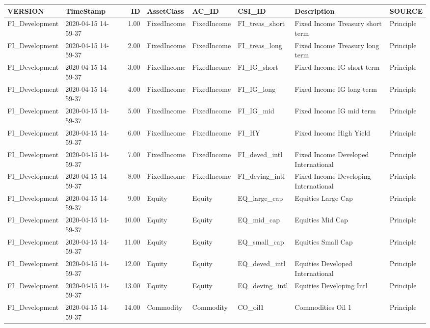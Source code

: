 \begin{longtable}{llrlllll}
  \hline
VERSION & TimeStamp & ID & AssetClass & AC\_ID & CSI\_ID & Description & SOURCE \\ 
  \hline
FI\_Development & 2020-04-15 14-59-37 & 1.00 & FixedIncome & FixedIncome & FI\_treas\_short & Fixed Income Treasury short term & Principle \\ 
  FI\_Development & 2020-04-15 14-59-37 & 2.00 & FixedIncome & FixedIncome & FI\_treas\_long & Fixed Income Treasury long term & Principle \\ 
  FI\_Development & 2020-04-15 14-59-37 & 3.00 & FixedIncome & FixedIncome & FI\_IG\_short & Fixed Income IG short term & Principle \\ 
  FI\_Development & 2020-04-15 14-59-37 & 4.00 & FixedIncome & FixedIncome & FI\_IG\_long & Fixed Income IG long term & Principle \\ 
  FI\_Development & 2020-04-15 14-59-37 & 5.00 & FixedIncome & FixedIncome & FI\_IG\_mid & Fixed Income IG mid term & Principle \\ 
  FI\_Development & 2020-04-15 14-59-37 & 6.00 & FixedIncome & FixedIncome & FI\_HY & Fixed Income High Yield & Principle \\ 
  FI\_Development & 2020-04-15 14-59-37 & 7.00 & FixedIncome & FixedIncome & FI\_deved\_intl & Fixed Income Developed International & Principle \\ 
  FI\_Development & 2020-04-15 14-59-37 & 8.00 & FixedIncome & FixedIncome & FI\_deving\_intl & Fixed Income Developing International & Principle \\ 
  FI\_Development & 2020-04-15 14-59-37 & 9.00 & Equity & Equity & EQ\_large\_cap & Equities Large Cap & Principle \\ 
  FI\_Development & 2020-04-15 14-59-37 & 10.00 & Equity & Equity & EQ\_mid\_cap & Equities Mid Cap & Principle \\ 
  FI\_Development & 2020-04-15 14-59-37 & 11.00 & Equity & Equity & EQ\_small\_cap & Equities Small Cap & Principle \\ 
  FI\_Development & 2020-04-15 14-59-37 & 12.00 & Equity & Equity & EQ\_deved\_intl & Equities Developed International & Principle \\ 
  FI\_Development & 2020-04-15 14-59-37 & 13.00 & Equity & Equity & EQ\_deving\_intl & Equities Developing Intl & Principle \\ 
  FI\_Development & 2020-04-15 14-59-37 & 14.00 & Commodity & Commodity & CO\_oil1 & Commodities Oil 1 & Principle \\ 

\end{longtable}

